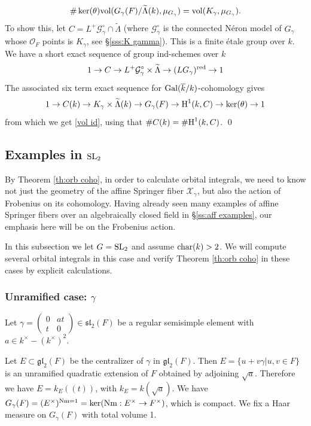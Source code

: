 \documentclass[]{pcmi}
\let\oldsubsubsection\subsubsection
\renewcommand{\subsubsection}[1]{%
\setcounter{subsubsection}{\value{equation}}%
\oldsubsubsection{#1}%
\refstepcounter{equation}%
}
\theoremstyle{plain}
\theoremstyle{definition}
\def\calG{\mathcal{G}}
\def\calO{\mathcal{O}}
\newcommand{\sX}{\ensuremath{\mathscr{X}}\xspace}
\newcommand{\sX}{\ensuremath{\mathcal{X}}\xspace}
\newcommand\Gal{\textup{Gal}}
\newcommand{\Nm}{\textup{Nm}}
\newcommand{\red}{\textup{red}}
\newcommand{\vol}{\textup{vol}}
\newcommand\SL{\textup{SL}}
\renewcommand\sl{\mathfrak{sl}}
\renewcommand{\L}{\Lambda}
\newcommand{\wt}{\widetilde}
\newcommand\mat[4]{\left(\begin{array}{cc} #1 & #2 \\ #3 & #4 \end{array}\right)}  %
\newcommand\chark{\textup{char}(k)}
\newcommand{\lr}[1]{(\!(#1)\!)}
\newcommand{\cohog}[2]{\textup{H}^{#1}({#2})}     %
\newcommand{\kbar}{\overline{k}}
\newcommand{\Gk}{\Gal(\kbar/k)}
\begin{document}
\begin{equation}\label{vol id}
\#\ker(\theta)\vol(G_{\gamma}(F)/\wt\L(k),\mu_{G_{\gamma}})=\vol(K_{\gamma},\mu_{G_{\gamma}}).
\end{equation}
To show this, let $C=L^{+}\calG^{\circ}_{\gamma}\cap \wt\L$ (where $\calG^{\circ}_{\gamma}$ is the connected N\'eron model of $G_{\gamma}$ whose $\calO_{F}$ points is $K_{\gamma}$, see \S\ref{sss:K gamma}). This is a finite \'etale group over $k$. We have a short exact  sequence of group ind-schemes over $k$
\begin{equation*}
1\to C\to L^{+}\calG^{\circ}_{\gamma}\times\wt\L\to (LG_{\gamma})^{\red}\to 1
\end{equation*}
The associated six term exact sequence for $\Gk$-cohomology gives
\begin{equation*}
1\to C(k)\to K_{\gamma}\times \wt\L(k)\to G_{\gamma}(F)\to \cohog{1}{k,C}\to \ker(\theta)\to1
\end{equation*}
from which we get \eqref{vol id}, using that $\#C(k)=\#\cohog{1}{k,C}$. \qed



\subsection{Examples in $\SL_{2}$}
By Theorem \ref{th:orb coho}, in order to calculate orbital integrals, we need to know not just the geometry of the affine Springer fiber $\sX_{\gamma}$, but also the action of Frobenius on its cohomology. Having already seen many examples of affine Springer fibers over an algebraically closed field in \S\ref{ss:aff examples}, our emphasis here will be on the Frobenius action. 

In this subsection we let $G=\SL_{2}$ and assume $\chark>2$. We will compute several orbital integrals in this case and verify Theorem \ref{th:orb coho} in these cases by explicit calculations.

\subsubsection{Unramified case: $\gamma$}\label{unram sl2} Let $\gamma=\mat{0}{at}{t}{0}\in\sl_{2}(F)$ be a regular semisimple element with $a\in k^{\times}-(k^{\times})^{2}$. 

Let $E\subset\mathfrak{gl}_{2}(F)$ be the centralizer of $\gamma$ in $\mathfrak{gl}_{2}(F)$. Then $E=\{u+v\gamma|u,v\in F\}$ is an unramified quadratic extension of $F$ obtained by adjoining $\sqrt{a}$. Therefore we have $E=k_{E}\lr{t}$, with $k_{E}= k(\sqrt{a})$. We have $G_{\gamma}(F)=(E^{\times})^{\Nm=1}=\ker(\Nm: E^{\times}\to F^{\times})$, which is compact. We fix a Haar measure on $G_{\gamma}(F)$ with total volume 1. 
\end{document}

